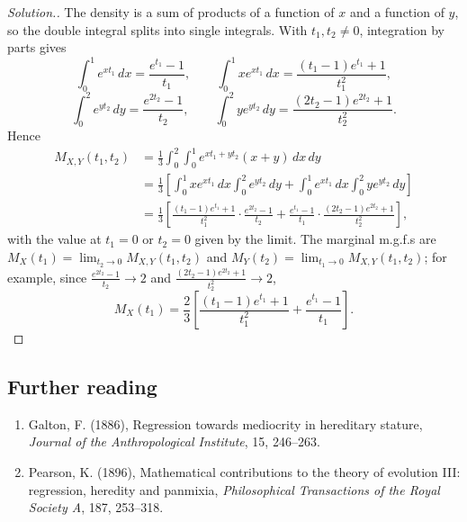 \documentclass[12pt,a4paper]{report}
\theoremstyle{definition}
\theoremstyle{plain}
\theoremstyle{definition}
\begin{document}
\begin{proof}[\textit{Solution}.]

The density is a sum of products of a function of $x$ and a function of $y$, so the
double integral splits into single integrals. With $t_1, t_2\ne 0$, integration by parts gives
\[\int_0^1e^{xt_1}\,dx = \frac{e^{t_1} - 1}{t_1},\qquad
\int_0^1xe^{xt_1}\,dx = \frac{(t_1 - 1)e^{t_1} + 1}{t_1^2},\]
\[\int_0^2e^{yt_2}\,dy = \frac{e^{2t_2} - 1}{t_2},\qquad
\int_0^2ye^{yt_2}\,dy = \frac{(2t_2 - 1)e^{2t_2} + 1}{t_2^2} .\]
Hence
\begin{align*}
M_{X,Y}(t_1,t_2) & = \frac13\int^2_0\int^1_0e^{xt_1+yt_2}(x+y)\, dx\, dy\\
& = \frac13\left[\int_0^1xe^{xt_1}\,dx\int_0^2e^{yt_2}\,dy + \int_0^1e^{xt_1}\,dx\int_0^2ye^{yt_2}\,dy\right]\\
& = \frac13\left[\frac{(t_1 - 1)e^{t_1} + 1}{t_1^2}\cdot\frac{e^{2t_2} - 1}{t_2} + \frac{e^{t_1} - 1}{t_1}\cdot\frac{(2t_2 - 1)e^{2t_2} + 1}{t_2^2}\right],
\end{align*}
with the value at $t_1 = 0$ or $t_2 = 0$ given by the limit. The marginal m.g.f.s are
$M_X(t_1) = \lim_{t_2\to 0}M_{X,Y}(t_1, t_2)$ and $M_Y(t_2) = \lim_{t_1\to 0}M_{X,Y}(t_1, t_2)$;
for example, since $\frac{e^{2t_2} - 1}{t_2}\to 2$ and $\frac{(2t_2 - 1)e^{2t_2} + 1}{t_2^2}\to 2$,
\[M_X(t_1) = \frac23\left[\frac{(t_1 - 1)e^{t_1} + 1}{t_1^2} + \frac{e^{t_1} - 1}{t_1}\right].\]
\end{proof}











\subsection*{Further reading}
\begin{enumerate}
\item Galton, F. (1886), Regression towards mediocrity in hereditary stature,
\emph{Journal of the Anthropological Institute}, 15, 246--263.
\item Pearson, K. (1896), Mathematical contributions to the theory of evolution III:
regression, heredity and panmixia, \emph{Philosophical Transactions of the Royal
Society A}, 187, 253--318.
\end{enumerate}
\end{document}
